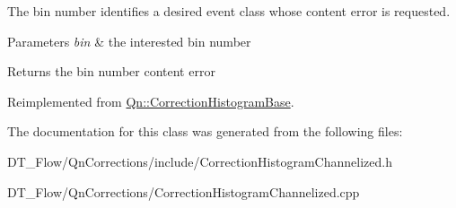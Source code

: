 The bin number identifies a desired event class whose content error is requested.


\begin{DoxyParams}{Parameters}
{\em bin} & the interested bin number \\
\hline
\end{DoxyParams}
\begin{DoxyReturn}{Returns}
the bin number content error 
\end{DoxyReturn}


Reimplemented from \mbox{\hyperlink{classQn_1_1CorrectionHistogramBase_a50a7dd4c5bbe5e4d0e405365c2a9104d}{Qn\+::\+Correction\+Histogram\+Base}}.



The documentation for this class was generated from the following files\+:\begin{DoxyCompactItemize}
\item 
D\+T\+\_\+\+Flow/\+Qn\+Corrections/include/Correction\+Histogram\+Channelized.\+h\item 
D\+T\+\_\+\+Flow/\+Qn\+Corrections/Correction\+Histogram\+Channelized.\+cpp\end{DoxyCompactItemize}
